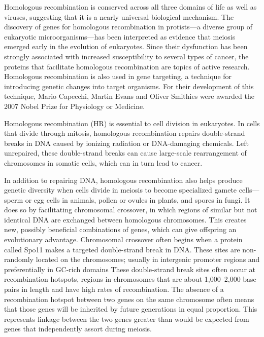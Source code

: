 Homologous recombination is conserved across all three domains of life as well as viruses, suggesting that it is a nearly universal biological mechanism. The discovery of genes for homologous recombination in protists---a diverse group of eukaryotic microorganisms---has been interpreted as evidence that meiosis emerged early in the evolution of eukaryotes. Since their dysfunction has been strongly associated with increased susceptibility to several types of cancer, the proteins that facilitate homologous recombination are topics of active research. Homologous recombination is also used in gene targeting, a technique for introducing genetic changes into target organisms. For their development of this technique, Mario Capecchi, Martin Evans and Oliver Smithies were awarded the 2007 Nobel Prize for Physiology or Medicine.

Homologous recombination (HR) is essential to cell division in eukaryotes. In cells that divide through mitosis, homologous recombination repairs double-strand breaks in DNA caused by ionizing radiation or DNA-damaging chemicals. Left unrepaired, these double-strand breaks can cause large-scale rearrangement of chromosomes in somatic cells, which can in turn lead to cancer.

In addition to repairing DNA, homologous recombination also helps produce genetic diversity when cells divide in meiosis to become specialized gamete cells---sperm or egg cells in animals, pollen or ovules in plants, and spores in fungi. It does so by facilitating chromosomal crossover, in which regions of similar but not identical DNA are exchanged between homologous chromosomes. This creates new, possibly beneficial combinations of genes, which can give offspring an evolutionary advantage. Chromosomal crossover often begins when a protein called Spo11 makes a targeted double-strand break in DNA. These sites are non-randomly located on the chromosomes; usually in intergenic promoter regions and preferentially in GC-rich domains These double-strand break sites often occur at recombination hotspots, regions in chromosomes that are about 1,000--2,000 base pairs in length and have high rates of recombination. The absence of a recombination hotspot between two genes on the same chromosome often means that those genes will be inherited by future generations in equal proportion. This represents linkage between the two genes greater than would be expected from genes that independently assort during meiosis.

